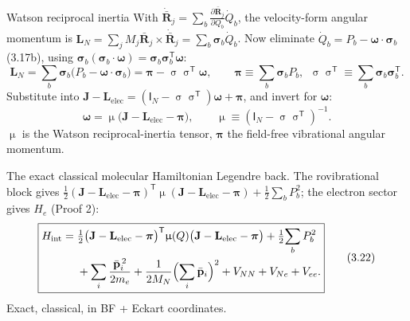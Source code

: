 \documentclass[aspectratio=169,10pt]{beamer}
\newcommand{\Mmu}{\upmu}        %
\newcommand{\Msig}{\upsigma}    %
\newcommand{\stagenum}{0}
\newcommand{\setstage}[1]{\renewcommand{\stagenum}{#1}}
\begin{document}
\begin{frame}{Watson reciprocal inertia}
\setstage{2}
\small
With $\dot{\bar{\mathbf R}}_j=\sum_b\tfrac{\partial\bar{\mathbf R}_j}{\partial Q_b}\dot Q_b$, the velocity-form angular momentum is $\mathbf L_N=\sum_j M_j\bar{\mathbf R}_j\!\times\!\dot{\bar{\mathbf R}}_j=\sum_b\boldsymbol\sigma_b\dot Q_b$. Now eliminate $\dot Q_b=P_b-\boldsymbol\omega\!\cdot\!\boldsymbol\sigma_b$ (3.17b), using $\boldsymbol\sigma_b(\boldsymbol\sigma_b\!\cdot\!\boldsymbol\omega)=\boldsymbol\sigma_b\boldsymbol\sigma_b^{\mathsf T}\boldsymbol\omega$:
\begin{equation*}
\mathbf L_N=\sum_b\boldsymbol\sigma_b\bigl(P_b-\boldsymbol\omega\!\cdot\!\boldsymbol\sigma_b\bigr)=\boldsymbol\pi-\Msig\Msig^{\mathsf T}\boldsymbol\omega,\qquad
\boldsymbol\pi\equiv\sum_b\boldsymbol\sigma_bP_b,\ \ \Msig\Msig^{\mathsf T}\equiv\sum_b\boldsymbol\sigma_b\boldsymbol\sigma_b^{\mathsf T}. \tag{3.20a}
\end{equation*}
Substitute into $\mathbf J-\mathbf L_{\mathrm{elec}}=(\mathsf I_N-\Msig\Msig^{\mathsf T})\boldsymbol\omega+\boldsymbol\pi$, and invert for $\boldsymbol\omega$:
\begin{equation*}
\boxed{\;\boldsymbol{\omega}=\Mmu\bigl(\mathbf{J}-\mathbf{L}_{\mathrm{elec}}-\boldsymbol{\pi}\bigr),\qquad
\Mmu\equiv(\mathsf{I}_N-\Msig\Msig^{\mathsf T})^{-1}.\;}\tag{3.20}
\end{equation*}
$\Mmu$ is the \alert{Watson reciprocal-inertia tensor}, $\boldsymbol\pi$ the field-free vibrational angular momentum.
\end{frame}

\begin{frame}{The exact classical molecular Hamiltonian}
\setstage{2}
Legendre back. The rovibrational block gives $\tfrac12(\mathbf J-\mathbf L_{\mathrm{elec}}-\boldsymbol\pi)^{\mathsf T}\Mmu(\mathbf J-\mathbf L_{\mathrm{elec}}-\boldsymbol\pi)+\tfrac12\sum_bP_b^2$; the electron sector gives $H_e$ (Proof 2):
\begin{equation*}
\boxed{
\begin{aligned}
H_{\mathrm{int}}=\;&\tfrac12\bigl(\mathbf{J}-\mathbf{L}_{\mathrm{elec}}-\boldsymbol{\pi}\bigr)^{\mathsf T}\Mmu(Q)\bigl(\mathbf{J}-\mathbf{L}_{\mathrm{elec}}-\boldsymbol{\pi}\bigr)+\tfrac12\!\sum_bP_b^2\\
&+\sum_i\frac{\bar{\mathbf p}_i^{\,2}}{2m_e}+\frac{1}{2M_N}\Bigl(\sum_i\bar{\mathbf p}_i\Bigr)^{2}+V_{NN}+V_{Ne}+V_{ee}.
\end{aligned}}\tag{3.22}
\end{equation*}
\centering Exact, classical, in BF + Eckart coordinates.
\end{frame}
\end{document}
